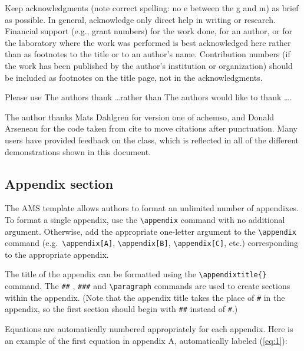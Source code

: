 \documentclass[draft]{ametsoc}
\begin{document}
\acknowledgments

Keep acknowledgments (note correct spelling: no e between the g and m)
as brief as possible. In general, acknowledge only direct help in
writing or research. Financial support (e.g., grant numbers) for the
work done, for an author, or for the laboratory where the work was
performed is best acknowledged here rather than as footnotes to the
title or to an author's name. Contribution numbers (if the work has been
published by the author's institution or organization) should be
included as footnotes on the title page, not in the acknowledgments.

Please use The authors thank \ldots rather than The authors would like
to thank \ldots.

The author thanks Mats Dahlgren for version one of \textsf{achemso}, and
Donald Arseneau for the code taken from \textsf{cite} to move citations
after punctuation. Many users have provided feedback on the class, which
is reflected in all of the different demonstrations shown in this
document.

\appendix[A]


\hypertarget{appendix-section}{%
\subsection{Appendix section}\label{appendix-section}}

The AMS template allows authors to format an unlimited number of
appendixes. To format a single appendix, use the
\texttt{\textbackslash{}appendix} command with no additional argument.
Otherwise, add the appropriate one-letter argument to the
\texttt{\textbackslash{}appendix} command
(e.g.~\texttt{\textbackslash{}appendix{[}A{]}},
\texttt{\textbackslash{}appendix{[}B{]}},
\texttt{\textbackslash{}appendix{[}C{]}}, etc.) corresponding to the
appropriate appendix.

The title of the appendix can be formatted using the
\texttt{\textbackslash{}appendixtitle\{\}} command. The \texttt{\#\#} ,
\texttt{\#\#\#} and \texttt{\textbackslash{}paragraph} commands are used
to create sections within the appendix. (Note that the appendix title
takes the place of \texttt{\#} in the appendix, so the first section
should begin with \texttt{\#\#} instead of \texttt{\#}.)

Equations are automatically numbered appropriately for each appendix.
Here is an example of the first equation in appendix A, automatically
labeled (\ref{eq:1}):
\end{document}

